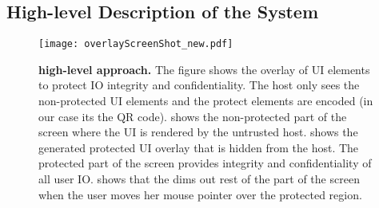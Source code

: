 \iffalse
\subsection{Challenges}


Modern user interfaces (UIs) are diverse and hard to generalize, resulting in many possible ways to provide input and receiving output.  This makes the protection of IO integrity, and confidentiality is a particularly challenging task. For example, given a mouse movement and clicking on a button from the user, it is necessary to understand the user intention that corresponds to the mouse movements. 


The second challenge arises while ensuring IO confidentiality. For mouse input, hiding the mouse movement while keeping all the regular functionality intact is a challenging task as we do not consider large TCB-based solution such as a trusted hypervisor.


Apart from these functional challenges for implementation, there exist multiple attack vectors that we want to provide protection. 
\fi

\subsection{High-level Description of the System}


\begin{figure}[t]
\centering
\texttt{[image: overlayScreenShot\_new.pdf]}
\caption{\textbf{\name high-level approach.} The figure shows the \device overlay of UI elements to protect IO integrity and confidentiality. \one The host only sees the non-protected UI elements and the protect elements are encoded (in our case its the QR code). \two shows the non-protected part of the screen where the UI is rendered by the untrusted host. \three shows the \device generated protected UI overlay that is hidden from the host. The protected part of the screen provides integrity and confidentiality of all user IO. \four shows that the \device dims out rest of the part of the screen when the user moves her mouse pointer over the protected region.}
\spacesave
\label{fig:screenshot_1}
\end{figure}



